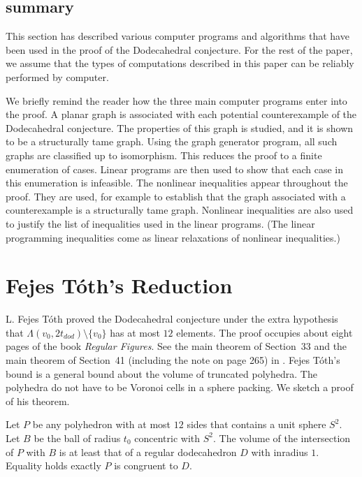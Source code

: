 \subsection{summary}

This section has described various computer programs 
and algorithms that
have been used in the proof of the Dodecahedral conjecture.
For the rest of the paper, we assume that the types of
computations described in this paper can be reliably performed
by computer.

We briefly remind the reader how the three main computer programs
enter into the proof.  A planar graph is associated with
each potential counterexample of the Dodecahedral conjecture.
The properties of this graph is studied, and it is shown to
be a structurally tame graph.  Using the graph generator program,
all such graphs are classified up to isomorphism.  This
reduces the proof to a finite enumeration of cases. Linear programs
are then used to show that each case in this enumeration is 
infeasible.  The nonlinear inequalities appear throughout the proof.
They are used, for example to establish that the graph associated
with a counterexample is a structurally tame graph.  Nonlinear
inequalities are also used to justify the list of inequalities
used in the linear programs. (The linear programming inequalities
come as linear relaxations of nonlinear inequalities.)



\section{Fejes T\'oth's Reduction}\label{sec:12sphere}

L. Fejes T\'oth proved  the Dodecahedral conjecture 
under the extra hypothesis that $\Lambda(v_0,2t_{dod})\setminus\{v_0\}$
has at most $12$  elements.  The proof occupies about
eight pages of the book {\it Regular Figures}.  See the main
theorem of
Section~33 and the main theorem of Section~41 (including
the note on page 265) in \cite{Toth2}.  Fejes T\'oth's
bound is a general bound about the volume of truncated polyhedra.
The polyhedra do not have to be Voronoi cells in a sphere packing.
We sketch a proof of his theorem.

\begin{theorem}  Let $P$ be any polyhedron with at most $12$ sides
that contains a unit sphere $S^2$.  Let $B$ be the ball of
radius $t_0$ concentric with $S^2$.  The volume of the intersection
of $P$ with $B$ is
at least that of a regular
dodecahedron $D$ with inradius $1$.
Equality holds exactly $P$ is congruent to $D$.
\end{theorem}

